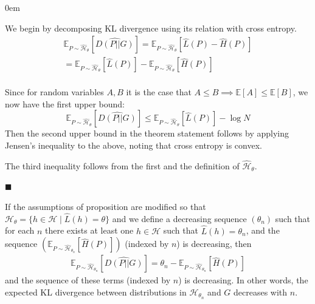 \documentclass[12pt]{article}
\renewcommand{\qed}{\hfill$\blacksquare$}
\renewenvironment{proof}{\begin{addmargin}[1em]{0em}\begin{newproof}}{\end{newproof}\end{addmargin}\qed}
\newenvironment{corollary}[2][Corollary]{\begin{trivlist}
\item[\hskip \labelsep {\bfseries #1}\hskip \labelsep {\bfseries #2.}]}{\end{trivlist}}
\begin{document}
\begin{proof}
We begin by decomposing KL divergence using its relation with cross entropy. 
\begin{gather*}
    \mathds{E}_{P\sim \hat{\mathcal{H}}_\theta}[\widehat{D(P||G)}] = \mathds{E}_{P\sim 
    \hat{\mathcal{H}}_\theta}[\hat{L}(P) - \hat{H}(P)] \\
    = \mathds{E}_{P\sim \hat{\mathcal{H}}_\theta}[\hat{L}(P)] - \mathds{E}_{P\sim \hat{\mathcal{H}}_\theta}[\hat{H}(P)] \\
\end{gather*}

Since for random variables $A,B$ it is the case that $A \leq B \implies \mathds{E}[A] \leq \mathds{E}[B]$, we now have the first upper bound:
\begin{equation*}
     \mathds{E}_{P\sim \hat{\mathcal{H}}_\theta}[\widehat{D(P||G)}] \leq \mathds{E}_{P\sim \hat{\mathcal{H}}_\theta}[\hat{L}(P)] - \log N
\end{equation*}
Then the second upper bound in the theorem statement follows by applying Jensen's inequality to the above, noting that cross entropy is convex. 

The third inequality follows from the first and the definition of $\hat{\mathcal{H}}_\theta$. 

 \end{proof}

\begin{corollary}{TEMP}
    If the assumptions of proposition are modified so that $\mathcal{H}_\theta = \{h \in \mathcal{H}\mid \hat{L}(h) = \theta\}$ and we define a decreasing sequence $(\theta_n)$ such that for each $n$ there exists at least one $h \in \mathcal{H}$ such that $\hat{L}(h)=\theta_n$, and the sequence $(\mathds{E}_{P\sim \hat{\mathcal{H}}_{\theta_n}}[\hat{H}(P)])$ (indexed by $n$) is decreasing, then
    \begin{gather*}
        \mathds{E}_{P\sim \hat{\mathcal{H}}_{\theta_n}}[\widehat{D(P||G)}] = \theta_n - \mathds{E}_{P\sim \hat{\mathcal{H}}_{\theta_n}}[\hat{H}(P)]
    \end{gather*}
    and the sequence of these terms (indexed by $n$) is decreasing. In other words, the expected KL divergence between distributions in $\mathcal{H}_{\theta_n}$ and $G$ decreases with $n$. 
\end{corollary}
% 
\end{document}
